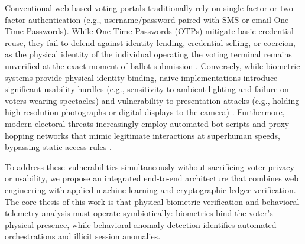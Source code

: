 \documentclass[conference]{IEEEtran}
\begin{document}
Conventional web-based voting portals traditionally rely on single-factor or two-factor authentication (e.g., username/password paired with SMS or email One-Time Passwords). While One-Time Passwords (OTPs) mitigate basic credential reuse, they fail to defend against identity lending, credential selling, or coercion, as the physical identity of the individual operating the voting terminal remains unverified at the exact moment of ballot submission \cite{grassi2017nist}. Conversely, while biometric systems provide physical identity binding, naive implementations introduce significant usability hurdles (e.g., sensitivity to ambient lighting and failure on voters wearing spectacles) and vulnerability to presentation attacks (e.g., holding high-resolution photographs or digital displays to the camera) \cite{marcel2014handbook}. Furthermore, modern electoral threats increasingly employ automated bot scripts and proxy-hopping networks that mimic legitimate interactions at superhuman speeds, bypassing static access rules \cite{antonakakis2017understanding}.

To address these vulnerabilities simultaneously without sacrificing voter privacy or usability, we propose an integrated end-to-end architecture that combines web engineering with applied machine learning and cryptographic ledger verification. The core thesis of this work is that physical biometric verification and behavioral telemetry analysis must operate symbiotically: biometrics bind the voter's physical presence, while behavioral anomaly detection identifies automated orchestrations and illicit session anomalies.
\end{document}
